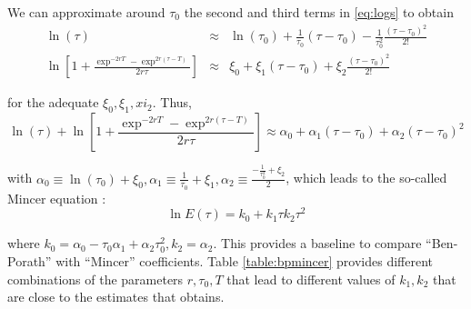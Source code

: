 \indent We can approximate around $\tau_{0}$ the second and third terms in \eqref{eq:logs} to obtain
\begin{eqnarray}
\ln(\tau) &\approx& \ln (\tau_{0}) + \frac{1}{\tau_{0}} \left( \tau - \tau_{0} \right) - \frac{1}{\tau_{0}^2} \frac{\left( \tau - \tau_{0} \right)^2}{2!} \nonumber \\
\ln \left[ 1 + \frac{\exp^{-2rT} - \exp^{2r(\tau - T)} }{2r \tau} \right] &\approx& \xi_{0} + \xi_{1} \left( \tau - \tau_{0} \right) + \xi_{2} \frac{\left( \tau - \tau_{0} \right)^2}{2!}
\end{eqnarray}

\noindent for the adequate $\xi_{0}, \xi_{1}, xi_{2}$. Thus,
\begin{equation}
\ln(\tau) + \ln \left[ 1 + \frac{\exp^{-2rT} - \exp^{2r(\tau - T)} }{2r \tau} \right] \approx \alpha_{0} + \alpha_{1}\left( \tau - \tau_{0} \right) + \alpha_{2} \left( \tau - \tau_{0} \right)^2
\end{equation}

\noindent with $\alpha_{0} \equiv \ln(\tau_{0}) + \xi_{0}, \alpha_{1} \equiv \frac{1}{\tau_{0}} + \xi_{1}, \alpha_{2} \equiv \frac{-\frac{1}{\tau_{0}^2} + \xi_{2}}{2}$, which leads to the so-called Mincer equation \citep[see][]{mincer1974schooling}:
\begin{equation}
\ln E(\tau) = k_{0} + k_{1} \tau k_{2} \tau^2 \label{eq:mincer}
\end{equation}

\noindent where $k_{0} = \alpha_{0} - \tau_{0} \alpha_{1} + \alpha_{2} \tau_{0}^2, k_{2} = \alpha_{2}$. This provides a baseline to compare ``Ben-Porath'' with ``Mincer'' coefficients. Table \ref{table:bpmincer} provides different combinations of the parameters $r, \tau_{0}, T$ that lead to different values of $k_{1}, k_{2}$ that are close to the estimates that \citet{mincer1974schooling} obtains.

